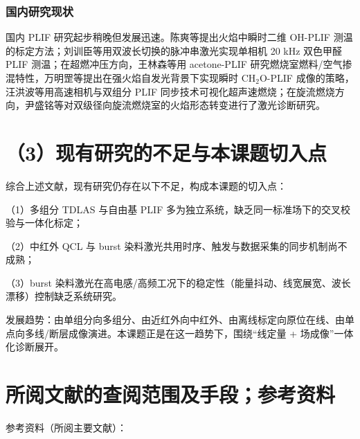 \subsubsection{国内研究现状}

国内 PLIF 研究起步稍晚但发展迅速。陈爽等提出火焰中瞬时二维 OH-PLIF 测温的标定方法\cite{ref39}；刘训臣等用双波长切换的脉冲串激光实现单相机 20 kHz 双色甲醛 PLIF 测温\cite{ref40}；在超燃冲压方向，王林森等用 acetone-PLIF 研究燃烧室燃料/空气掺混特性，万明罡等提出在强火焰自发光背景下实现瞬时 CH$_2$O-PLIF 成像的策略，汪洪波等用高速相机与双组分 PLIF 同步技术可视化超声速燃烧\cite{ref41}；在旋流燃烧方向，尹盛铭等对双级径向旋流燃烧室的火焰形态转变进行了激光诊断研究。

\section{（3）现有研究的不足与本课题切入点}

综合上述文献，现有研究仍存在以下不足，构成本课题的切入点：

（1）多组分 TDLAS 与自由基 PLIF 多为独立系统，缺乏同一标准场下的交叉校验与一体化标定；

（2）中红外 QCL 与 burst 染料激光共用时序、触发与数据采集的同步机制尚不成熟；

（3）burst 染料激光在高电感/高频工况下的稳定性（能量抖动、线宽展宽、波长漂移）控制缺乏系统研究。

发展趋势：由单组分向多组分、由近红外向中红外、由离线标定向原位在线、由单点向多线/断层成像演进。本课题正是在这一趋势下，围绕``线定量 + 场成像''一体化诊断展开。

\section{所阅文献的查阅范围及手段；参考资料}

参考资料（所阅主要文献）：

\printbibliography[heading=none]
